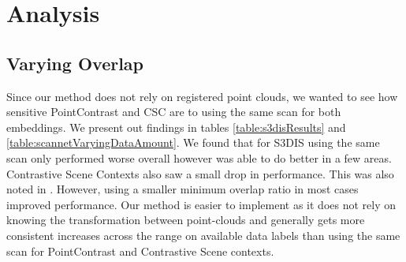\documentclass[10pt,twocolumn,letterpaper]{article}
\begin{document}
\begin{table}
    \centering
    \caption{\textbf{Object Detection using VoteNet (mAP)}}
    \label{table:scannetObjectDetection}
\end{table}

\section{Analysis}
\label{sec:analysis}

\subsection{Varying Overlap}
\label{sec:results:varying}

Since our method does not rely on registered point clouds, we wanted to see how sensitive PointContrast and CSC are to using the same scan for both embeddings. We present out findings in tables \ref{table:s3disResults} and \ref{table:scannetVaryingDataAmount}. We found that for S3DIS using the same scan only performed worse overall however was able to do better in a few areas. Contrastive Scene Contexts also saw a small drop in performance. This was also noted in \cite{xie2020pointcontrast}. However, using a smaller minimum overlap ratio in most cases improved performance. Our method is easier to implement as it does not rely on knowing the transformation between point-clouds and generally gets more consistent increases across the range on available data labels than using the same scan for PointContrast and Contrastive Scene contexts.
\end{document}
